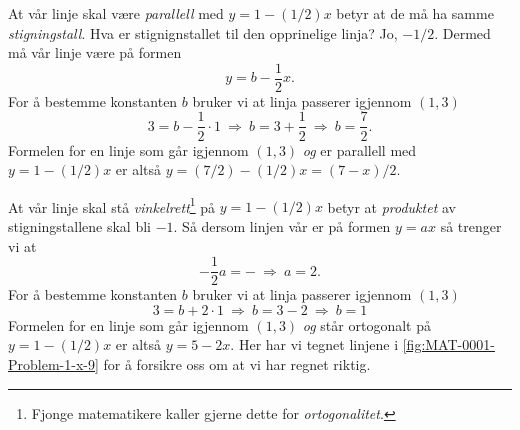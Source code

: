 \documentclass[a4paper,11pt]{article}
\begin{document}
\begin{solution}
     At 
    vår linje skal være \emph{parallell} med $y = 1 - (1/2)x$ betyr at 
    de må ha samme \emph{stigningstall}. Hva er stignignstallet til den opprinelige
    linja? Jo, $-1/2$. Dermed må vår linje være på formen
    \begin{equation*}
        y = b - \frac{1}{2}x.
    \end{equation*}
    For å bestemme konstanten $b$ bruker vi at linja passerer igjennom $(1, 3)$
    \begin{equation*}
        3 = b - \frac{1}{2} \cdot 1 
        \ \Rightarrow \ 
        b = 3 + \frac{1}{2}
        \ \Rightarrow \ 
        b = \frac{7}{2}.
    \end{equation*}
    Formelen for en linje som går igjennom $(1, 3)$ \emph{og} er parallell med 
    $y = 1 - (1/2)x$ er altså $y = (7/2) - (1/2)x = (7 - x)/2$.
    \medskip
\end{solution}

\begin{solution}
     At 
    vår linje skal stå \emph{vinkelrett}\footnote{Fjonge matematikere kaller gjerne dette for \emph{ortogonalitet}.} 
    på $y = 1 - (1/2)x$ betyr at \emph{produktet} av stigningstallene skal bli $-1$. 
    Så dersom linjen vår er på formen $y = ax$ så trenger vi at 
    \begin{equation*}
        -\frac{1}{2}a = - 
        \ \Rightarrow \ 
        a = 2.
    \end{equation*}
    For å bestemme konstanten $b$ bruker vi at linja passerer igjennom $(1, 3)$
    \begin{equation*}
        3 = b + 2 \cdot 1 
        \ \Rightarrow \ 
        b = 3 - 2
        \ \Rightarrow \ 
        b = 1
    \end{equation*}
    Formelen for en linje som går igjennom $(1, 3)$ \emph{og} står ortogonalt på 
    $y = 1 - (1/2)x$ er altså $y = 5 - 2x$. Her har vi tegnet linjene i \cref{fig:MAT-0001-Problem-1-x-9}
    for å forsikre oss om at vi har regnet riktig.
\end{solution}
\end{document}
